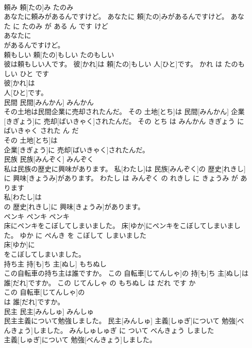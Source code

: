 \documentclass[8pt]{extreport}
\begin{document}
\begin{CJK}{UTF8}{min}
\\	頼み	頼[たの]み	たのみ	
\\	あなたに頼みがあるんですけど。	あなたに 頼[たの]みがあるんですけど。	あなた に たのみ が ある ん です けど	
\\	あなたに
\\	があるんですけど。			
\\	頼もしい	頼[たの]もしい	たのもしい	
\\	彼は頼もしい人です。	彼[かれ]は 頼[たの]もしい 人[ひと]です。	かれ は たのもしい ひと です	
\\	彼[かれ]は
\\	人[ひと]です。			
\\	民間	民間[みんかん]	みんかん	
\\	その土地は民間企業に売却されたんだ。	その 土地[とち]は 民間[みんかん] 企業[きぎょう]に 売却[ばいきゃく]されたんだ。	その とち は みんかん きぎょう に ばいきゃく された ん だ	
\\	その 土地[とち]は
\\	企業[きぎょう]に 売却[ばいきゃく]されたんだ。			
\\	民族	民族[みんぞく]	みんぞく	
\\	私は民族の歴史に興味があります。	私[わたし]は 民族[みんぞく]の 歴史[れきし]に 興味[きょうみ]があります。	わたし は みんぞく の れきし に きょうみ が あります	
\\	私[わたし]は
\\	の 歴史[れきし]に 興味[きょうみ]があります。			
\\	ペンキ	ペンキ	ペンキ	
\\	床にペンキをこぼしてしまいました。	床[ゆか]にペンキをこぼしてしまいました。	ゆか に ぺんき を こぼして しまいました	
\\	床[ゆか]に
\\	をこぼしてしまいました。			
\\	持ち主	持[も]ち 主[ぬし]	もちぬし	
\\	この自転車の持ち主は誰ですか。	この 自転車[じてんしゃ]の 持[も]ち 主[ぬし]は 誰[だれ]ですか。	この じてんしゃ の もちぬし は だれ です か	
\\	この 自転車[じてんしゃ]の
\\	は 誰[だれ]ですか。			
\\	民主	民主[みんしゅ]	みんしゅ	
\\	民主主義について勉強しました。	民主[みんしゅ] 主義[しゅぎ]について 勉強[べんきょう]しました。	みんしゅしゅぎ に ついて べんきょう しました	
\\	主義[しゅぎ]について 勉強[べんきょう]しました。			

\end{CJK}
\end{document}

